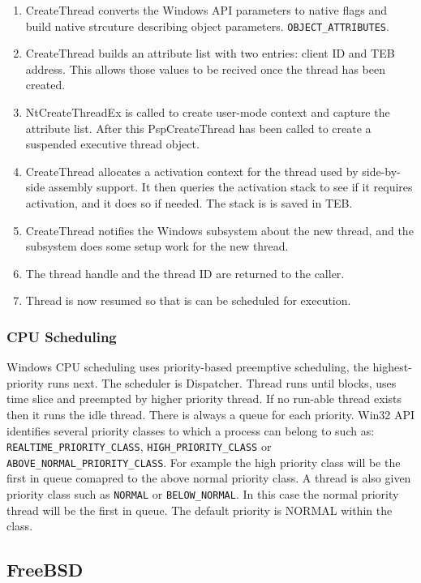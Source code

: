\documentclass[letterpaper,10pt,draftclsnofoot,onecolumn]{IEEEtran}
\begin{document}
\begin{enumerate}
\item CreateThread converts the Windows API parameters to native flags and build native strcuture describing object parameters. \verb|OBJECT_ATTRIBUTES|.
\item CreateThread builds an attribute list with two entries: client ID and TEB address. This allows those values to be recived once the thread has been created.
\item NtCreateThreadEx is called to create user-mode context and capture the attribute list. After this PspCreateThread has been called to create a suspended executive thread object.
\item CreateThread allocates a activation context for the thread used by side-by-side assembly support. It then queries the activation stack to see if it requires activation, and it does so if needed. The stack is is saved in TEB.
\item CreateThread notifies the Windows subsystem about the new thread, and the subsystem does some setup work for the new thread.
\item The thread handle and the thread ID are returned to the caller.
\item Thread is now resumed so that is can be scheduled for execution. \cite{[1]}
\end{enumerate}

\subsubsection*{CPU Scheduling}

Windows CPU scheduling uses priority-based preemptive scheduling, the highest-priority runs next. The scheduler is Dispatcher. Thread runs until blocks, uses time slice and preempted by higher priority thread. If no run-able thread exists then it runs the idle thread. There is always a queue for each priority. Win32 API identifies several priority classes to which a process can belong to such as: \verb|REALTIME_PRIORITY_CLASS|, \verb|HIGH_PRIORITY_CLASS| or \verb|ABOVE_NORMAL_PRIORITY_CLASS|. For example the high priority class will be the first in queue comapred to the above normal priority class. A thread is also given priority class such as \verb|NORMAL| or \verb|BELOW_NORMAL|. In this case the normal priority thread will be the first in queue. The default priority is NORMAL within the class.

\subsection*{FreeBSD}
\end{document}
